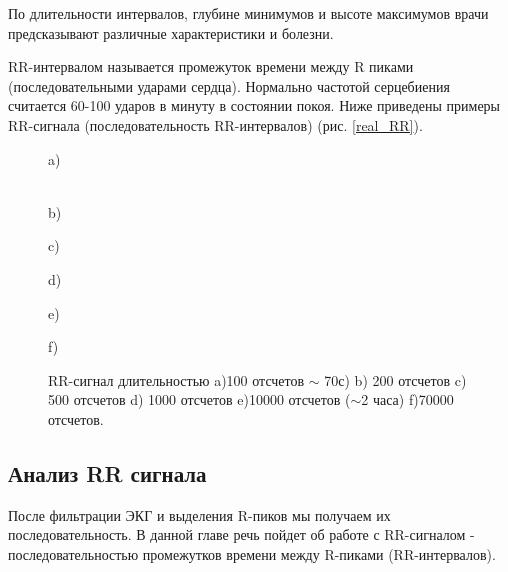 По длительности интервалов, глубине минимумов и высоте максимумов врачи предсказывают различные характеристики и болезни.

RR-интервалом называется промежуток времени между R пиками (последовательными ударами сердца). Нормально частотой серцебиения считается 60-100 ударов в минуту в состоянии покоя. Ниже приведены примеры RR-сигнала (последовательность RR-интервалов) (рис. \ref{real_RR}).

\begin{figure}[h]
	\begin{minipage}[h]{0.47\linewidth}
		\center{\texttt{[image: rr\_100]}} a) \\
	\end{minipage}
	\hfill
	\begin{minipage}[h]{0.47\linewidth}
		\center{\texttt{[image: rr\_200]}} \\b)
	\end{minipage}
	\vfill
	\begin{minipage}[h]{0.47\linewidth}
		\center{\texttt{[image: rr\_500]}} c) \\
	\end{minipage}
	\hfill
	\begin{minipage}[h]{0.47\linewidth}
		\center{\texttt{[image: rr\_1000]}} d) \\
	\end{minipage}
	\begin{minipage}[h]{0.47\linewidth}
		\center{\texttt{[image: rr\_10000]}} e) \\
	\end{minipage}
	\hfill
	\begin{minipage}[h]{0.47\linewidth}
		\center{\texttt{[image: rr\_70000]}} f) \\
	\end{minipage}
	\caption{RR-сигнал длительностью a)100 отсчетов $\sim$ 70с) b) 200 отсчетов
		c) 500 отсчетов d) 1000 отсчетов e)10000 отсчетов ($\sim $2 часа) f)70000 отсчетов.}
	\label{ris:real_RR}
\end{figure}


\subsection{Анализ RR сигнала}
После фильтрации ЭКГ и выделения R-пиков мы получаем их последовательность. В данной главе речь пойдет об работе с RR-сигналом - последовательностью промежутков времени между R-пиками (RR-интервалов).

